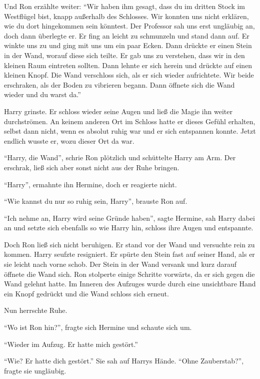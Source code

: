 Und Ron erzählte weiter: \enquote{Wir haben ihm gesagt, dass du im dritten Stock im Westflügel bist, knapp außerhalb des Schlosses. Wir konnten uns nicht erklären, wie du dort hingekommen sein könntest. Der Professor sah uns erst ungläubig an, doch dann überlegte er. Er fing an leicht zu schmunzeln und stand dann auf. Er winkte uns zu und ging mit uns um ein paar Ecken. Dann drückte er einen Stein in der Wand, worauf diese sich teilte. Er gab uns zu verstehen, dass wir in den kleinen Raum eintreten sollten. Dann lehnte er sich herein und drückte auf einen kleinen Knopf. Die Wand verschloss sich, als er sich wieder aufrichtete. Wir beide erschraken, als der Boden zu vibrieren begann. Dann öffnete sich die Wand wieder und du warst da.}

Harry grinste. Er schloss wieder seine Augen und ließ die Magie ihn weiter durchströmen. An keinem anderen Ort im Schloss hatte er dieses Gefühl erhalten, selbst dann nicht, wenn es absolut ruhig war und er sich entspannen konnte. Jetzt endlich wusste er, wozu dieser Ort da war.

\enquote{Harry, die Wand}, schrie Ron plötzlich und schüttelte Harry am Arm. Der erschrak, ließ sich aber sonst nicht aus der Ruhe bringen.

\enquote{Harry}, ermahnte ihn Hermine, doch er reagierte nicht.

\enquote{Wie kannst du nur so ruhig sein, Harry}, brauste Ron auf.

\enquote{Ich nehme an, Harry wird seine Gründe haben}, sagte Hermine, sah Harry dabei an und setzte sich ebenfalls so wie Harry hin, schloss ihre Augen und entspannte.

Doch Ron ließ sich nicht beruhigen. Er stand vor der Wand und versuchte rein zu kommen. Harry seufzte resigniert. Er spürte den Stein fast auf seiner Hand, als er sie leicht nach vorne schob. Der Stein in der Wand versank und kurz darauf öffnete die Wand sich. Ron stolperte einige Schritte vorwärts, da er sich gegen die Wand gelehnt hatte. Im Inneren des Aufzuges wurde durch eine unsichtbare Hand ein Knopf gedrückt und die Wand schloss sich erneut.

Nun herrschte Ruhe.

\enquote{Wo ist Ron hin?}, fragte sich Hermine und schaute sich um.

\enquote{Wieder im Aufzug. Er hatte mich gestört.}

\enquote{Wie? Er hatte dich gestört.} Sie sah auf Harrys Hände. \enquote{Ohne Zauberstab?}, fragte sie ungläubig.

